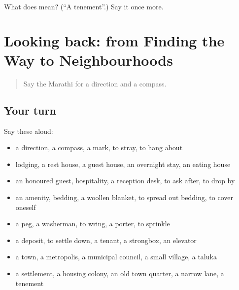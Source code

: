 \begin{tcolorbox}[breakable,colback=teal!4,colframe=teal!35!black,title={Before you move on}]
What does  mean? (\textquotedblleft{}A tenement\textquotedblright{}.) Say it once more.
\end{tcolorbox}
\section[(dialogue)]{Looking back: from Finding the Way to Neighbourhoods}

\label{lesson:MR-R419-review-412-419}



\begin{quote}
Say the Marathi for a direction and a compass.
\end{quote}

\subsection*{Your turn}
Say these aloud:

\begin{itemize}
\raggedright
  \item a direction, a compass, a mark, to stray, to hang about
  \item lodging, a rest house, a guest house, an overnight stay, an eating house
  \item an honoured guest, hospitality, a reception desk, to ask after, to drop by
  \item an amenity, bedding, a woollen blanket, to spread out bedding, to cover oneself
  \item a peg, a washerman, to wring, a porter, to sprinkle
  \item a deposit, to settle down, a tenant, a strongbox, an elevator
  \item a town, a metropolis, a municipal council, a small village, a taluka
  \item a settlement, a housing colony, an old town quarter, a narrow lane, a tenement
\end{itemize}

